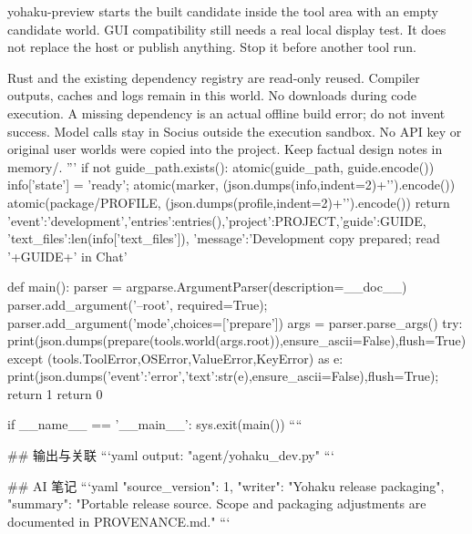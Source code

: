 yohaku-preview starts the built candidate inside the tool area with an empty
candidate world. GUI compatibility still needs a real local display test. It
does not replace the host or publish anything. Stop it before another tool run.

Rust and the existing dependency registry are read-only reused. Compiler outputs,
caches and logs remain in this world. No downloads during code execution. A
missing dependency is an actual offline build error; do not invent success.
Model calls stay in Socius outside the execution sandbox. No API key or original
user worlds were copied into the project. Keep factual design notes in memory/.
'''
    if not guide_path.exists(): atomic(guide_path, guide.encode())
    info['state'] = 'ready'; atomic(marker, (json.dumps(info,indent=2)+'\n').encode())
    atomic(package/PROFILE, (json.dumps(profile,indent=2)+'\n').encode())
    return {'event':'development','entries':entries(),'project':PROJECT,'guide':GUIDE,
            'text_files':len(info['text_files']), 'message':'Development copy prepared; read '+GUIDE+' in Chat'}


def main():
    parser = argparse.ArgumentParser(description=__doc__)
    parser.add_argument('--root', required=True); parser.add_argument('mode',choices=['prepare'])
    args = parser.parse_args()
    try: print(json.dumps(prepare(tools.world(args.root)),ensure_ascii=False),flush=True)
    except (tools.ToolError,OSError,ValueError,KeyError) as e:
        print(json.dumps({'event':'error','text':str(e)},ensure_ascii=False),flush=True); return 1
    return 0

if __name__ == '__main__': sys.exit(main())
````

## 输出与关联
```yaml
output: "agent/yohaku_dev.py"
```

## AI 笔记
```yaml
{"source_version": 1, "writer": "Yohaku release packaging", "summary": "Portable release source. Scope and packaging adjustments are documented in PROVENANCE.md."}
```
